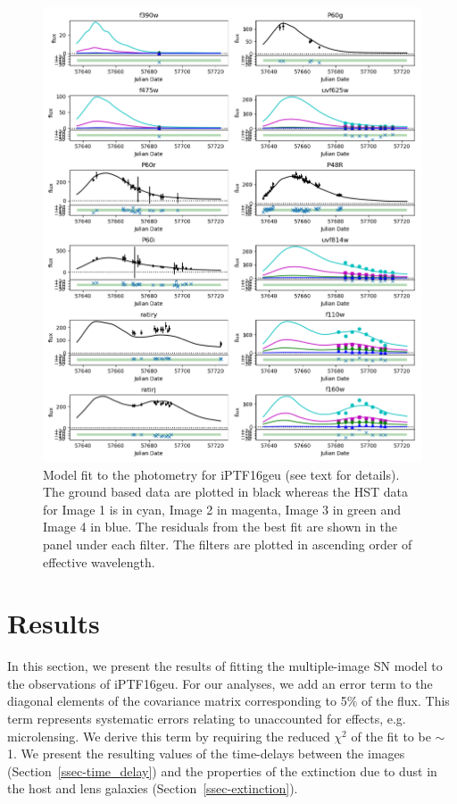 \documentclass[a4paper,fleqn,usenatbib]{mnras}
\begin{document}
\begin{figure}
    \centering
    \includegraphics[width=.9\textwidth]{16geu_lcfit.png}
    \caption{Model fit to the photometry for iPTF16geu (see text for details). The ground based data are plotted in black whereas the HST data for Image 1 is in cyan, Image 2 in magenta, Image 3 in green and Image 4 in blue. The residuals from the best fit are shown in the panel under each filter. The filters are plotted in ascending order of effective wavelength.}
    \label{fig:16geu_lc}
\end{figure}

\section{Results}
\label{sec:results}
In this section, we present the results of fitting the multiple-image SN model to the observations of iPTF16geu. For our analyses, we add an error term to the diagonal elements of the covariance matrix corresponding to 5$\%$ of the flux. This term represents systematic errors relating to unaccounted for effects, e.g. microlensing. We derive this term by requiring the reduced $\chi^2$ of the fit to be $\sim$ 1. 
 We present the resulting values of the time-delays between the images (Section~\ref{ssec-time_delay}) and the properties of the extinction due to dust in the host and lens galaxies (Section~\ref{ssec-extinction}). 
\end{document}
